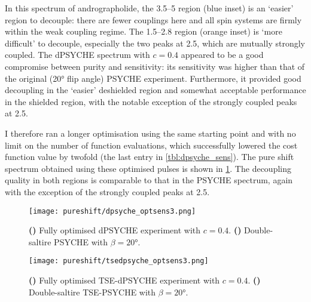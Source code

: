 In this spectrum of andrographolide, the \qtyrange{3.5}{5}{\ppm} region (blue inset) is an `easier' region to decouple: there are fewer couplings here and all spin systems are firmly within the weak coupling regime.
The \qtyrange{1.5}{2.8}{\ppm} region (orange inset) is `more difficult' to decouple, especially the two peaks at \qty{2.5}{\ppm}, which are mutually strongly coupled.
The dPSYCHE spectrum with $c = 0.4$ appeared to be a good compromise between purity and sensitivity: its sensitivity was higher than that of the original (\ang{20} flip angle) PSYCHE experiment.
Furthermore, it provided good decoupling in the `easier' deshielded region and somewhat acceptable performance in the shielded region, with the notable exception of the strongly coupled peaks at \qty{2.5}{\ppm}.

I therefore ran a longer optimisation using the same starting point and with no limit on the number of function evaluations, which successfully lowered the cost function value by twofold (the last entry in \cref{tbl:dpsyche_sens}).
The pure shift spectrum obtained using these optimised pulses is shown in \cref{fig:dpsyche_optsens3}.
The decoupling quality in both regions is comparable to that in the PSYCHE spectrum, again with the exception of the strongly coupled peaks at \qty{2.5}{\ppm}.

\begin{figure}[htb]
    \centering
    \texttt{[image: pureshift/dpsyche\_optsens3.png]}%
    {\label{fig:dpsyche_optsens3_d}}%
    {\label{fig:dpsyche_optsens3_p}}%
    \caption[dPSYCHE final optimisation with $c = 0.4$]{
        \textbf{()} Fully optimised dPSYCHE experiment with $c = 0.4$.
        \textbf{()} Double-saltire PSYCHE with $\beta = \ang{20}$.
    }
    \label{fig:dpsyche_optsens3}
\end{figure}

\begin{figure}[htb]
    \centering
    \texttt{[image: pureshift/tsedpsyche\_optsens3.png]}%
    {\label{fig:tsedpsyche_optsens3_d}}%
    {\label{fig:tsedpsyche_optsens3_p}}%
    \caption[TSE-dPSYCHE final optimisation with $c = 0.4$]{
        \textbf{()} Fully optimised TSE-dPSYCHE experiment with $c = 0.4$.
        \textbf{()} Double-saltire TSE-PSYCHE with $\beta = \ang{20}$.
    }
    \label{fig:tsedpsyche_optsens3}
\end{figure}


